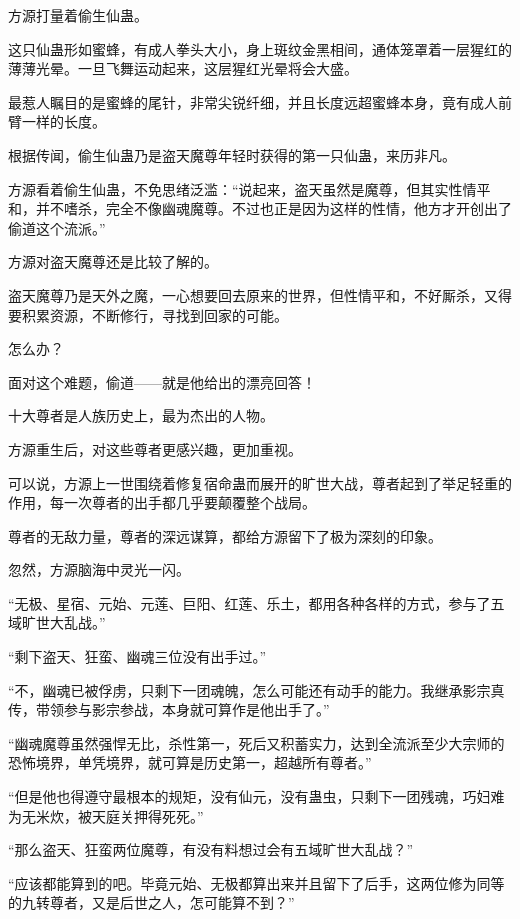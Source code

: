 
\begin{this_body}

方源打量着偷生仙蛊。

这只仙蛊形如蜜蜂，有成人拳头大小，身上斑纹金黑相间，通体笼罩着一层猩红的薄薄光晕。一旦飞舞运动起来，这层猩红光晕将会大盛。

最惹人瞩目的是蜜蜂的尾针，非常尖锐纤细，并且长度远超蜜蜂本身，竟有成人前臂一样的长度。

根据传闻，偷生仙蛊乃是盗天魔尊年轻时获得的第一只仙蛊，来历非凡。

方源看着偷生仙蛊，不免思绪泛滥：“说起来，盗天虽然是魔尊，但其实性情平和，并不嗜杀，完全不像幽魂魔尊。不过也正是因为这样的性情，他方才开创出了偷道这个流派。”

方源对盗天魔尊还是比较了解的。

盗天魔尊乃是天外之魔，一心想要回去原来的世界，但性情平和，不好厮杀，又得要积累资源，不断修行，寻找到回家的可能。

怎么办？

面对这个难题，偷道——就是他给出的漂亮回答！

十大尊者是人族历史上，最为杰出的人物。

方源重生后，对这些尊者更感兴趣，更加重视。

可以说，方源上一世围绕着修复宿命蛊而展开的旷世大战，尊者起到了举足轻重的作用，每一次尊者的出手都几乎要颠覆整个战局。

尊者的无敌力量，尊者的深远谋算，都给方源留下了极为深刻的印象。

忽然，方源脑海中灵光一闪。

“无极、星宿、元始、元莲、巨阳、红莲、乐土，都用各种各样的方式，参与了五域旷世大乱战。”

“剩下盗天、狂蛮、幽魂三位没有出手过。”

“不，幽魂已被俘虏，只剩下一团魂魄，怎么可能还有动手的能力。我继承影宗真传，带领参与影宗参战，本身就可算作是他出手了。”

“幽魂魔尊虽然强悍无比，杀性第一，死后又积蓄实力，达到全流派至少大宗师的恐怖境界，单凭境界，就可算是历史第一，超越所有尊者。”

“但是他也得遵守最根本的规矩，没有仙元，没有蛊虫，只剩下一团残魂，巧妇难为无米炊，被天庭关押得死死。”

“那么盗天、狂蛮两位魔尊，有没有料想过会有五域旷世大乱战？”

“应该都能算到的吧。毕竟元始、无极都算出来并且留下了后手，这两位修为同等的九转尊者，又是后世之人，怎可能算不到？”


\end{this_body}
